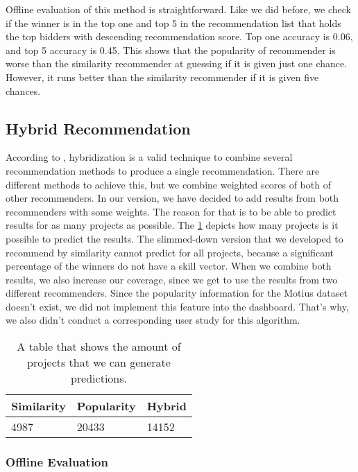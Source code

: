 Offline evaluation of this method is straightforward. Like we did before, we check if the winner is in the top one and top 5 in the recommendation list that holds the top bidders with descending recommendation score. Top one accuracy is 0.06, and top 5 accuracy is 0.45. This shows that the popularity of recommender is worse than the similarity recommender at guessing if it is given just one chance. However, it runs better than the similarity recommender if it is given five chances. 


\subsection{Hybrid Recommendation}

According to \cite{burke2002hybrid}, hybridization is a valid technique to combine several recommendation methods to produce a single recommendation. There are different methods to achieve this, but we combine weighted scores of both of other recommenders. In our version, we have decided to add results from both recommenders with some weights. The reason for that is to be able to predict results for as many projects as possible. The \ref{tab:evaluation-amount-prediction} depicts how many projects is it possible to predict the results. The slimmed-down version that we developed to recommend by similarity cannot predict for all projects, because a significant percentage of the winners do not have a skill vector. When we combine both results, we also increase our coverage, since we get to use the results from two different recommenders. Since the popularity information for the Motius dataset doesn't exist, we did not implement this feature into the dashboard. That's why, we also didn't conduct a corresponding user study for this algorithm.

\begin{table}[htp]
	\caption[The number of predicted projects]{A table that shows the amount of projects that we can generate predictions.}\label{tab:evaluation-amount-prediction}
	\centering
	\begin{tabular}{l l l}
		\toprule
		Similarity & Popularity & Hybrid \\
		\midrule
		4987 & 20433 & 14152 \\
		\bottomrule
	\end{tabular}
\end{table}


\subsubsection{Offline Evaluation}

